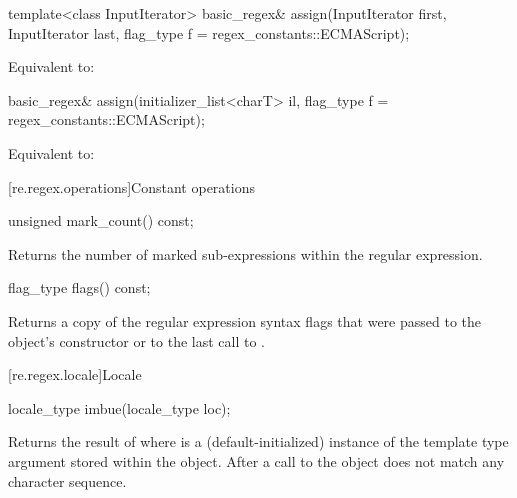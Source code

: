 %
\begin{itemdecl}
template<class InputIterator>
  basic_regex& assign(InputIterator first, InputIterator last,
                      flag_type f = regex_constants::ECMAScript);
\end{itemdecl}

\begin{itemdescr}
\pnum
\effects
Equivalent to: 
\end{itemdescr}

%
\begin{itemdecl}
basic_regex& assign(initializer_list<charT> il,
                    flag_type f = regex_constants::ECMAScript);
\end{itemdecl}

\begin{itemdescr}
\pnum
\effects
Equivalent to: 
\end{itemdescr}


[re.regex.operations]{Constant operations}

%
\begin{itemdecl}
unsigned mark_count() const;
\end{itemdecl}

\begin{itemdescr}
\pnum
\effects
Returns the number of marked sub-expressions within the
regular expression.
\end{itemdescr}

%
\begin{itemdecl}
flag_type flags() const;
\end{itemdecl}

\begin{itemdescr}
\pnum
\effects
Returns a copy of the regular expression syntax flags that
were passed to the object's constructor or to the last call
to .
\end{itemdescr}

[re.regex.locale]{Locale}%

%
\begin{itemdecl}
locale_type imbue(locale_type loc);
\end{itemdecl}

\begin{itemdescr}
\pnum
\effects
Returns the result of  where
 is a (default-initialized) instance of the template
type argument  stored within the object.  After a call
to  the  object does not match any
character sequence.
\end{itemdescr}

